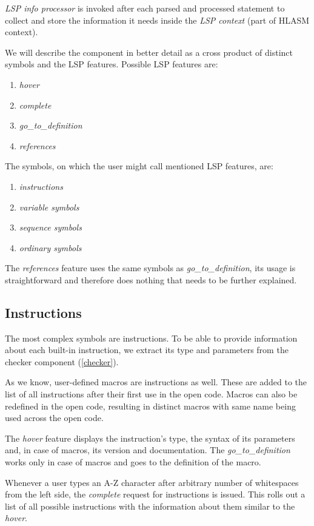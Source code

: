 \emph{LSP info processor} is invoked after each parsed and processed statement to collect and store the information it needs inside the \emph{LSP context} (part of HLASM context). 

We will describe the component in better detail as a cross product of distinct symbols and the LSP features. Possible LSP features are:
\begin{enumerate}
	\item \emph{hover}
	\item \emph{complete}
	\item \emph{go\_to\_definition}
	\item \emph{references}
\end{enumerate}
The symbols, on which the user might call mentioned LSP features, are:
\begin{enumerate}
	\item \emph{instructions}
	\item \emph{variable symbols}
	\item \emph{sequence symbols}
	\item \emph{ordinary symbols}
\end{enumerate}

The \emph{references} feature uses the same symbols as \emph{go\_to\_definition}, its usage is straightforward and therefore does nothing that needs to be further explained.

\subsection{Instructions}

The most complex symbols are instructions. To be able to provide information about each built-in instruction, we extract its type and parameters from the checker component (\cref{checker}).

As we know, user-defined macros are instructions as well. These are added to the list of all instructions after their first use in the open code. Macros can also be redefined in the open code, resulting in distinct macros with same name being used across the open code.

The \emph{hover} feature displays the instruction's type, the syntax of its parameters and, in case of macros, its version and documentation. The \emph{go\_to\_definition} works only in case of macros and goes to the definition of the macro.

Whenever a user types an A-Z character after arbitrary number of whitespaces from the left side, the \emph{complete} request for instructions is issued. This rolls out a list of all possible instructions with the information about them similar to the \emph{hover}.

